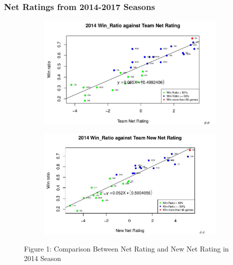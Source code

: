 \documentclass[11pt]{article}
\begin{document}
\subsubsection*{Net Ratings from 2014-2017 Seasons}
\begin{figure}[h!]
  \centering
  \begin{subfigure}[b]{0.45\linewidth}
    \includegraphics[width=\linewidth]{nr_14.jpg}
  \end{subfigure}
  \begin{subfigure}[b]{0.45\linewidth}
    \includegraphics[width=\linewidth]{new_nr_14.jpg}
  \end{subfigure}

\bigskip
Figure 1: Comparison Between Net Rating and New Net Rating in 2014 Season
\end{figure}
\end{document}
